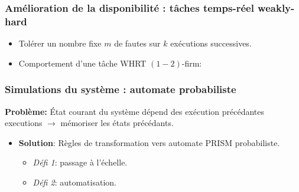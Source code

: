 \documentclass[xcolor=table]{beamer}
\begin{document}
\begin{frame}
	\frametitle{Amélioration de la disponibilité : tâches temps-réel weakly-hard}
	\begin{itemize}
		\item Tolérer un nombre fixe $m$ de fautes sur $k$ exécutions successives.
		\item Comportement d'une tâche WHRT $(1-2)$-firm:
	\end{itemize}
	
	\begin{figure}
		\quad
	\end{figure}
\end{frame}


\begin{frame}
	\frametitle{Simulations du système : automate probabiliste}
	\centering
	\textbf{Problème:} État courant du système dépend des exécution précédantes 
	executions $\rightarrow$ mémoriser les états précédants.
	\begin{itemize}
		\item<2-> \textbf{Solution}: Règles de transformation vers automate PRISM probabiliste.
		\begin{itemize}
			\item<3-> \textit{Défi 1}: passage à l'échelle.
			\item<3-> \textit{Défi 2}: automatisation.
			
		\end{itemize}
		
	\end{itemize}
	\setcounter{subfigure}{0}
	\begin{figure}
		\vspace{-0.7cm}
		\label{fig:prism_rules}
	\end{figure}
\end{frame}
\end{document}
